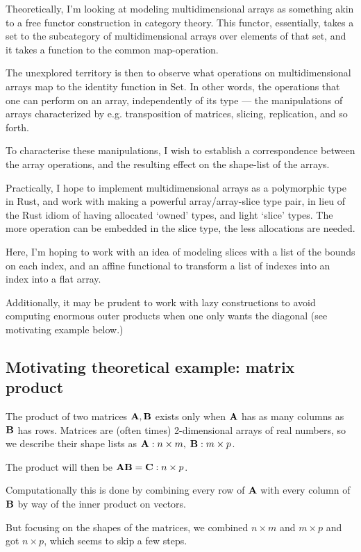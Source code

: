 \documentclass[a4paper,11pt,notitlepage]{article}
\begin{document}
Theoretically, I'm looking at modeling multidimensional arrays as something akin to a
free functor construction in category theory. This functor, essentially, takes a set to
the subcategory of multidimensional arrays over elements of that set, and it takes a
function to the common map-operation.

The unexplored territory is then to observe what operations on multidimensional arrays map
to the identity function in Set. In other words, the operations that one can perform on an
array, independently of its type --- the manipulations of arrays characterized by e.g. transposition
of matrices, slicing, replication, and so forth.

To characterise these manipulations, I wish to establish a correspondence between the
array operations, and the resulting effect on the shape-list of the arrays.

Practically, I hope to implement multidimensional arrays as a polymorphic type in Rust,
and work with making a powerful array/array-slice type pair, in lieu of the Rust idiom of
having allocated `owned' types, and light `slice' types. The more operation can be embedded
in the slice type, the less allocations are needed.

Here, I'm hoping to work with an idea of modeling slices with a list of the bounds on
each index, and an affine functional to transform a list of indexes into an index into a flat
array.

Additionally, it may be prudent to work with lazy constructions to avoid computing enormous
outer products when one only wants the diagonal (see motivating example below.)

\subsection{Motivating theoretical example: matrix product}

The product of two matrices \(\bm{\mathrm{A}}, \bm{\mathrm{B}}\) exists only when \(\bm{\mathrm{A}}\) has as many columns
as \(\bm{\mathrm{B}}\) has rows. Matrices are (often times) 2-dimensional arrays of real numbers,
so we describe their shape lists as \(\bm{\mathrm{A}} : n \times m, \; \bm{\mathrm{B}} : m \times p\).

The product will then be \(\bm{\mathrm{A}} \bm{\mathrm{B}} = \bm{\mathrm{C}} : n \times p\).

Computationally this is done by combining every row of \(\bm{\mathrm{A}}\) with every column
of \(\bm{\mathrm{B}}\) by way of the inner product on vectors.

But focusing on the shapes of the matrices, we combined \(n \times m\) and \(m \times p\) and
got \(n \times p\), which seems to skip a few steps.
\end{document}
